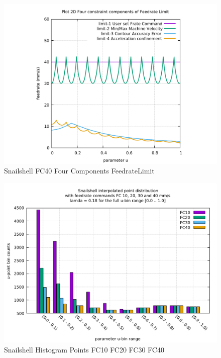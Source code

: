 \begin{figure}
	\caption     {Snailshell FC40 Four Components FeedrateLimit}
	\label{34-img-Snailshell-FC40-Four-Components-FeedrateLimit.pdf}
	\includegraphics[width=1.00\textwidth]{Chap4/appendix/app-Snailshell/plots/34-img-Snailshell-FC40-Four-Components-FeedrateLimit.pdf}
\end{figure}


\clearpage
\pagebreak

\begin{figure}
	\centering
	\caption     {Snailshell Histogram Points FC10 FC20 FC30 FC40}
	\label{35-img-Snailshell-Histogram-Points-FC10-FC20-FC30-FC40.pdf}
\includegraphics[width=1.00\textwidth]{Chap4/appendix/app-Snailshell/plots/35-img-Snailshell-Histogram-Points-FC10-FC20-FC30-FC40.pdf} 
\end{figure}



